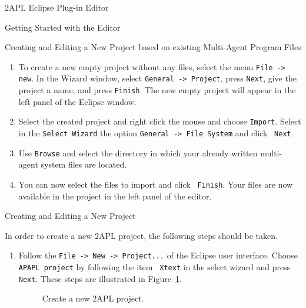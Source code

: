 \begin{chapter}{2APL Eclipse Plug-in Editor}
\begin{section}{Getting Started with the Editor}
\begin{subsection}{Creating and Editing a New Project based on existing Multi-Agent Program Files}
\begin{enumerate}
        \item To create a new empty project without any files, select the menu \texttt{File -> new}.
        In the Wizard window, select \texttt{General -> Project}, press {\tt Next}, give the project
        a name, and press {\tt Finish}. The new empty project will
        appear in the left panel of the Eclipse window.

        \item Select the created project and right click the mouse and choose {\tt Import}.
        Select in the {\tt Select Wizard} the option {\tt General -> File System} and click {\tt
        Next}.

        \item Use {\tt Browse} and select the directory in which your already written multi-agent system
        files are located.

        \item You can now select the files to import and click {\tt
        Finish}. Your files are now available in the project in the
        left panel of the editor.
\end{enumerate}

\end{subsection}

\begin{subsection}{Creating and Editing a New Project}

In order to create a new 2APL project, the following steps should be
taken.
\begin{enumerate}
        \item Follow the {\tt File -> New -> Project...} of the Eclipse user
        interface. Choose {\tt APAPL project} by following the item {\tt
        Xtext} in the select wizard and press {\tt Next}. These
        steps are illustrated in Figure~\ref{fig:usage1}.
        \begin{figure}[h]
            \begin{minipage}{0.6\linewidth}
                \begin{center}
                \end{center}
            \end{minipage}
            \hspace{.5cm}
            \begin{minipage}{0.3\linewidth}
                \begin{center}
                \end{center}
            \end{minipage}
            \caption{Create a new 2APL project.}\label{fig:usage1}
        \end{figure}


\end{enumerate}
\end{subsection}
\end{section}
\end{chapter}
